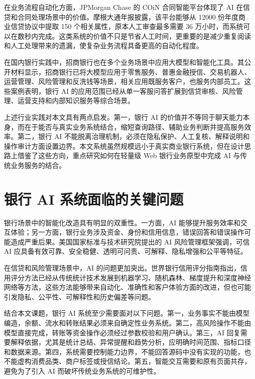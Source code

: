 \documentclass[bachelor, print]{xduthesis}
\begin{document}
在业务流程自动化方面，JPMorgan Chase 的 COiN 合同智能平台体现了 AI 在信贷和合同处理场景中的价值。摩根大通年报披露，该平台能够从 12000 份年度商业信贷协议中提取 150 个相关属性，原本人工审查最多需要 36 万小时，而系统可以在数秒内完成\cite{jpmorgan2016annual}。这类系统的价值不只是节省人工时间，更重要的是减少重复阅读和人工处理带来的遗漏，使复杂业务流程具备更高的自动化程度。

在国内银行实践中，招商银行也在多个业务场景中应用大模型和智能化工具。其公开材料显示，招商银行已将大模型应用于零售服务、普惠金融授信、交易机器人、运营管理、风险管理和反洗钱等场景，相关应用既服务客户，也服务内部员工\cite{cmb2024annual}。这些案例表明，银行 AI 的应用范围已经从单一客服问答扩展到信贷审核、风险管理、运营支持和内部知识服务等综合场景。

上述行业实践对本文具有两点启发。第一，银行 AI 的价值并不等同于聊天能力本身，而在于能否与真实业务系统结合，缩短查询路径、辅助业务判断并提高服务效率。第二，银行 AI 不能脱离治理机制，必须在隐私保护、人工复核、解释说明和操作审计方面设置边界。本文系统虽然规模远小于真实商业银行系统，但在设计思路上借鉴了这些方向，重点研究如何在轻量级 Web 银行业务原型中完成 AI 与传统业务服务的结合。

\section{银行 AI 系统面临的关键问题}

银行场景中的智能化改造具有明显的双重性。一方面，AI 能够提升服务效率和交互体验；另一方面，银行业务涉及资金、身份和信用信息，错误回答和错误操作可能造成严重后果。美国国家标准与技术研究院提出的 AI 风险管理框架强调，可信 AI 应具备有效可靠、安全稳健、透明可问责、可解释、隐私增强和公平等特征\cite{nist2023airmf}。

在信贷和风险管理场景中，AI 的问题更加突出。世界银行信用评分指南指出，信用评分方法已经从传统统计技术发展到机器学习、随机森林、梯度提升和深度神经网络等方法，这些方法能够带来自动化、准确性和客户体验方面的改进，但也可能引发隐私、公平性、可解释性和历史偏差等问题\cite{worldbank2020creditscoring}。

结合本文课题，银行 AI 系统至少需要面对以下问题。第一，业务事实不能由模型编造，余额、流水和转账结果必须来自确定性业务系统。第二，高风险操作不能由模型直接完成，转账等资金操作必须经过参数校验和用户确认。第三，AI 回复需要解释依据，尤其是统计总结、异常提醒和趋势分析，应明确时间范围、指标口径和数据来源。第四，系统需要控制能力边界，不能回答源码中没有实现的功能，也不能虚构消费品类、商户标签或授信结论。第五，智能交互需要和原有页面共存，避免为了引入 AI 而破坏传统业务系统的可维护性。
\end{document}
